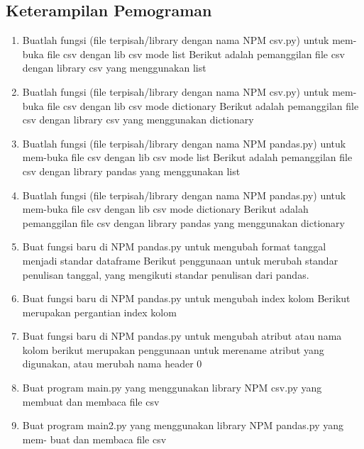 \subsection{Keterampilan Pemograman}

\begin{enumerate}

\item Buatlah fungsi (file terpisah/library dengan nama NPM csv.py) untuk mem-buka file csv dengan lib csv mode list
Berikut adalah pemanggilan file csv dengan library csv yang menggunakan list

\item Buatlah fungsi (file terpisah/library dengan nama NPM csv.py) untuk mem-buka file csv dengan lib csv mode dictionary Berikut adalah pemanggilan file csv dengan library csv yang menggunakan dictionary

\item Buatlah fungsi (file terpisah/library dengan nama NPM pandas.py) untuk mem-buka file csv dengan lib csv mode list Berikut adalah pemanggilan file csv dengan library pandas yang menggunakan list

\item Buatlah fungsi (file terpisah/library dengan nama NPM pandas.py) untuk mem-buka file csv dengan lib csv mode dictionary Berikut adalah pemanggilan file csv dengan library pandas yang menggunakan dictionary

\item Buat fungsi baru di NPM pandas.py untuk mengubah format tanggal menjadi standar dataframe
Berikut penggunaan untuk merubah standar penulisan tanggal, yang mengikuti standar penulisan dari pandas.

\item Buat fungsi baru di NPM pandas.py untuk mengubah index kolom
Berikut merupakan pergantian index kolom

\item Buat fungsi baru di NPM pandas.py untuk mengubah atribut atau nama kolom berikut merupakan penggunaan untuk merename atribut yang digunakan, atau merubah nama header 0

\item Buat program main.py yang menggunakan library NPM csv.py yang membuat dan membaca 
file csv

\item Buat program main2.py yang menggunakan library NPM pandas.py yang mem- buat dan membaca 
file csv


\end{enumerate}
